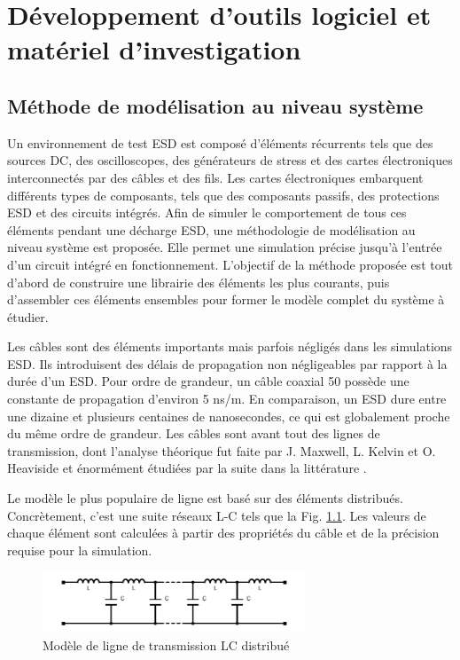 \chapter{Développement d'outils logiciel et matériel d'investigation}
\label{chap:2}
\section{Méthode de modélisation au niveau système}

Un environnement de test ESD est composé d'éléments récurrents tels que des sources DC, des oscilloscopes, des générateurs de stress et des cartes électroniques interconnectés par des câbles et des fils.
Les cartes électroniques embarquent différents types de composants, tels que des composants passifs, des protections ESD et des circuits intégrés.
Afin de simuler le comportement de tous ces éléments pendant une décharge ESD, une méthodologie de modélisation au niveau système est proposée.
Elle permet une simulation précise jusqu'à l'entrée d'un circuit intégré en fonctionnement.
L'objectif de la méthode proposée est tout d'abord de construire une librairie des éléments les plus courants, puis d'assembler ces éléments ensembles pour former le modèle complet du système à étudier.

Les câbles sont des éléments importants mais parfois négligés dans les simulations ESD.
Ils introduisent des délais de propagation non négligeables par rapport à la durée d'un ESD.
Pour ordre de grandeur, un câble coaxial 50\textOmega{} possède une constante de propagation d'environ 5 ns/m.
En comparaison, un ESD dure entre une dizaine et plusieurs centaines de nanosecondes, ce qui est globalement proche du même ordre de grandeur.
Les câbles sont avant tout des lignes de transmission, dont l'analyse théorique fut faite par J. Maxwell, L. Kelvin et O. Heaviside et énormément étudiées par la suite dans la littérature \cite{branin-tl-ref, hf-coax,lossy-tl,emc-analysis-tl}.

Le modèle le plus populaire de ligne est basé sur des éléments distribués.
Concrètement, c'est une suite réseaux L-C tels que la Fig. \ref{fig:dis-line-model}.
Les valeurs de chaque élément sont calculées à partir des propriétés du câble et de la précision requise pour la simulation.

\begin{figure}[!h]
  \centering
  \includegraphics[width=0.7\textwidth]{src/1/figures/lc_ladder.pdf}
  \caption{Modèle de ligne de transmission LC distribué}
  \label{fig:dis-line-model}
\end{figure}


